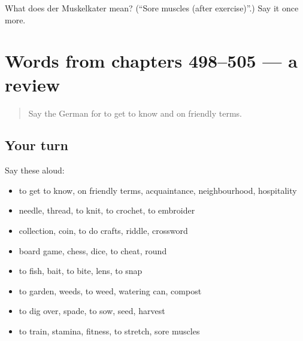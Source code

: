 \begin{tcolorbox}[breakable,colback=teal!4,colframe=teal!35!black,title={Before you move on}]
What does der Muskelkater mean? (\textquotedblleft{}Sore muscles (after exercise)\textquotedblright{}.) Say it once more.
\end{tcolorbox}
\section[(dialogue)]{Words from chapters 498–505 — a review}

\label{lesson:GE-R505-review-498-505}



\begin{quote}
Say the German for to get to know and on friendly terms.
\end{quote}

\subsection*{Your turn}
Say these aloud:

\begin{itemize}
\raggedright
  \item to get to know, on friendly terms, acquaintance, neighbourhood, hospitality
  \item needle, thread, to knit, to crochet, to embroider
  \item collection, coin, to do crafts, riddle, crossword
  \item board game, chess, dice, to cheat, round
  \item to fish, bait, to bite, lens, to snap
  \item to garden, weeds, to weed, watering can, compost
  \item to dig over, spade, to sow, seed, harvest
  \item to train, stamina, fitness, to stretch, sore muscles
\end{itemize}

